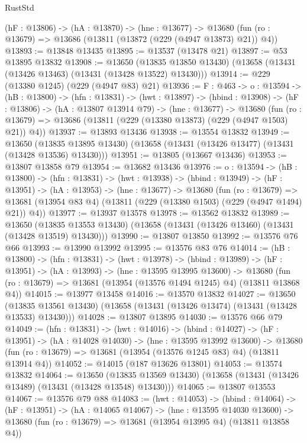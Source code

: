 \begin{lexlean}{RustStd}
\begin{coremodule}
  (hF : @13806) ->
  (hA : @13870) ->
  (hne : @13677) ->
  @13680 (fun (ro : @13679) => @13686 (@13811 (@13872 (@229 (@4947 @13873) @21)) @4))
@13893 := @13848 @13435
@13895 := @13537 (@13478 @21)
@13897 := @53 @13895 @13832
@13908 := @13650
    (@13835 @13850 @13430)
    (@13658 (@13431 (@13426 @13463) (@13431 (@13428 @13522) @13430)))
@13914 := @229 (@13380 @1245) (@229 (@4947 @83) @21)
@13936 := {F : @463} ->
  {o : @13594} ->
  (hB : @13800) ->
  (hfn : @13831) ->
  (hwt : @13897) ->
  (hbind : @13908) ->
  (hF : @13806) ->
  (hA : @13807 @13914 @79) ->
  (hne : @13677) ->
  @13680 (fun (ro : @13679) => @13686 (@13811 (@229 (@13380 @13873) (@229 (@4947 @1503) @21)) @4))
@13937 := @13893 @13436
@13938 := @13554 @13832
@13949 := @13650
    (@13835 @13895 @13430)
    (@13658 (@13431 (@13426 @13477) (@13431 (@13428 @13536) @13430)))
@13951 := @13805 (@13667 @13436)
@13953 := @13807 @13858 @79
@13954 := @13682 @13436
@13976 := {o : @13594} ->
  (hB : @13800) ->
  (hfn : @13831) ->
  (hwt : @13938) ->
  (hbind : @13949) ->
  (hF : @13951) ->
  (hA : @13953) ->
  (hne : @13677) ->
  @13680
    (fun (ro : @13679) =>
    @13681 (@13954 @83 @4) (@13811 (@229 (@13380 @1503) (@229 (@4947 @1494) @21)) @4))
@13977 := @13937 @13578
@13978 := @13562 @13832
@13989 := @13650
    (@13835 @13553 @13430)
    (@13658 (@13431 (@13426 @13460) (@13431 (@13428 @13519) @13430)))
@13990 := @13807 @13850
@13992 := @13576 @76 @66
@13993 := @13990 @13992
@13995 := @13576 @83 @76
@14014 := (hB : @13800) ->
  (hfn : @13831) ->
  (hwt : @13978) ->
  (hbind : @13989) ->
  (hF : @13951) ->
  (hA : @13993) ->
  (hne : @13595 @13995 @13600) ->
  @13680 (fun (ro : @13679) => @13681 (@13954 (@13576 @1494 @1245) @4) (@13811 @13868 @4))
@14015 := @13977 @13458
@14016 := @13570 @13832
@14027 := @13650
    (@13835 @13561 @13430)
    (@13658 (@13431 (@13426 @13474) (@13431 (@13428 @13533) @13430)))
@14028 := @13807 @13895
@14030 := @13576 @66 @79
@14049 := (hfn : @13831) ->
  (hwt : @14016) ->
  (hbind : @14027) ->
  (hF : @13951) ->
  (hA : @14028 @14030) ->
  (hne : @13595 @13992 @13600) ->
  @13680 (fun (ro : @13679) => @13681 (@13954 (@13576 @1245 @83) @4) (@13811 @13914 @4))
@14052 := @14015 (@187 @13626 @13801)
@14053 := @13574 @13832
@14064 := @13650
    (@13835 @13569 @13430)
    (@13658 (@13431 (@13426 @13489) (@13431 (@13428 @13548) @13430)))
@14065 := @13807 @13553
@14067 := @13576 @79 @88
@14083 := (hwt : @14053) ->
  (hbind : @14064) ->
  (hF : @13951) ->
  (hA : @14065 @14067) ->
  (hne : @13595 @14030 @13600) ->
  @13680 (fun (ro : @13679) => @13681 (@13954 @13995 @4) (@13811 @13858 @4))

\end{coremodule}
\end{lexlean}
